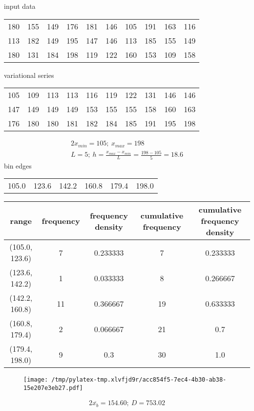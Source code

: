 \documentclass{article}%
\begin{document}
%
\normalsize%
input data%
\begin{longtable}{l l l l l l l l l l }%
180&155&149&176&181&146&105&191&163&116\\%
113&182&149&195&147&146&113&185&155&149\\%
180&131&184&198&119&122&160&153&109&158\\%
\end{longtable}%
variational series%
\begin{longtable}{l l l l l l l l l l }%
105&109&113&113&116&119&122&131&146&146\\%
147&149&149&149&153&155&155&158&160&163\\%
176&180&180&181&182&184&185&191&195&198\\%
\end{longtable}%
\begin{alignat*}{2}%
x_{min} = 105; ~ x_{max} = 198 \\%
L = 5;
            ~ h = \frac { x_{max} - x_{min} } L
                = \frac { 198 - 105 } 5
                = 18.6%
\end{alignat*}%
bin edges%
\begin{longtable}{l l l l l l }%
105.0&123.6&142.2&160.8&179.4&198.0\\%
\end{longtable}%
\begin{tabular}{c|c|c|c|c}
\toprule
         range &  frequency & frequency density &  cumulative frequency & cumulative frequency density \\
\midrule
(105.0, 123.6) &          7 &          0.233333 &                     7 &                     0.233333 \\
(123.6, 142.2) &          1 &          0.033333 &                     8 &                     0.266667 \\
(142.2, 160.8) &         11 &          0.366667 &                    19 &                     0.633333 \\
(160.8, 179.4) &          2 &          0.066667 &                    21 &                          0.7 \\
(179.4, 198.0) &          9 &               0.3 &                    30 &                          1.0 \\
\bottomrule
\end{tabular}
%


\begin{figure}[H]%
\centering%
\texttt{[image: /tmp/pylatex-tmp.xlvfjd9r/acc854f5-7ec4-4b30-ab38-15e207e3eb27.pdf]}%
\end{figure}

%
\begin{alignat*}{2}%
\overline { x_{b} } = 154.60%
;~ D = 753.02%
\end{alignat*}%
\end{document}
